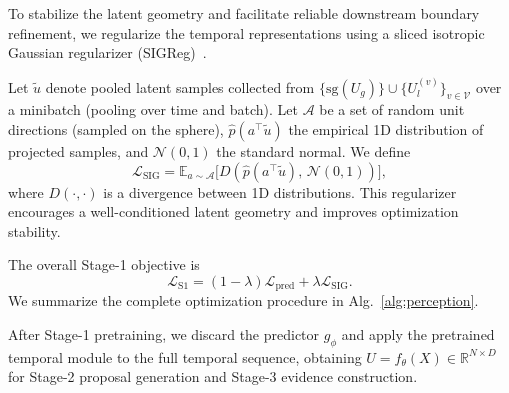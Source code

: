 \documentclass{article}
\theoremstyle{plain}
\theoremstyle{definition}
\theoremstyle{remark}
\begin{document}
To stabilize the latent geometry and facilitate reliable downstream boundary refinement, we regularize the temporal representations using a sliced isotropic Gaussian regularizer (SIGReg)~\cite{LeJEPA}. 

Let $\tilde{u}$ denote pooled latent samples collected from $\{\mathrm{sg}(U_g)\}\cup\{U_l^{(v)}\}_{v\in\mathcal{V}}$ over a minibatch (pooling over time and batch).
Let $\mathcal{A}$ be a set of random unit directions (sampled on the sphere), $\hat{p}(a^\top \tilde{u})$ the empirical 1D distribution of projected samples, and $\mathcal{N}(0,1)$ the standard normal.
We define
\begin{equation}
\mathcal{L}_{\mathrm{SIG}}
=
\mathbb{E}_{a\sim \mathcal{A}}
\Big[
D\!\left(\hat{p}\!\left(a^{\top}\tilde{u}\right),\, \mathcal{N}(0,1)\right)
\Big],
\label{eq:sigreg_new}
\end{equation}
where $D(\cdot,\cdot)$ is a divergence between 1D distributions.
This regularizer encourages a well-conditioned latent geometry and improves optimization stability. 

The overall Stage-1 objective is
\begin{equation}
\mathcal{L}_{\mathrm{S1}}
=
(1-\lambda)\mathcal{L}_{\mathrm{pred}}
+
\lambda\mathcal{L}_{\mathrm{SIG}}.
\label{eq:perc_total}
\end{equation}
We summarize the complete optimization procedure in Alg.~\ref{alg:perception}. 

After Stage-1 pretraining, we discard the predictor $g_\phi$ and apply the pretrained temporal module to the full temporal sequence, obtaining $U=f_\theta(X)\in\mathbb{R}^{N\times D}$ for Stage-2 proposal generation and Stage-3 evidence construction.
\end{document}
